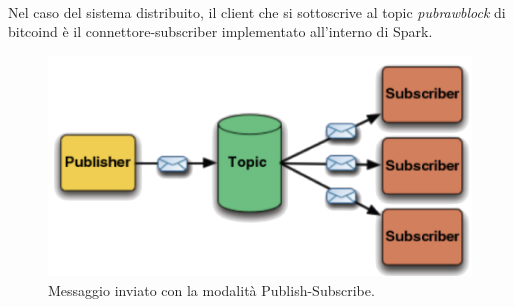 \\Nel caso del sistema distribuito, il client che si sottoscrive al topic \textit{pubrawblock} di bitcoind è il connettore-subscriber implementato all'interno di Spark. 
\begin{figure}[H]
	\centering
	\includegraphics[width=\textwidth, height=0.25\textheight, keepaspectratio]{images/sub_pub.png}
	\caption{Messaggio inviato con la modalità Publish-Subscribe.}
	\label{fig:PubSubTopic}
\end{figure}